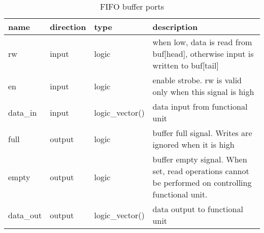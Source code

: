 	\FloatBarrier
	
	\begin{table}[!htb]
		\begin{tabular}{| l| l | l | p{8cm} |}
			\hline
			\textbf{name} & \textbf{direction} & \textbf{type} &  \textbf{description}\\ \hline
			rw & input & logic & when low, data is read from buf[head], otherwise input is written to buf[tail]\\ \hline
			en & input & logic & enable strobe. rw is valid only when this signal is high \\ \hline
			data\_in & input & logic\_vector(\dataW) & data input from functional unit \\ \hline
			full & output & logic & buffer full signal. Writes are ignored when it is high \\ \hline
			empty & output & logic & buffer empty signal. When set, read operations cannot be performed on controlling functional unit. \\ \hline
			data\_out & output & logic\_vector(\dataW) & data output to functional unit \\ \hline
		\end{tabular}
		\caption{FIFO buffer ports}
		\label{table:out_buffer_description}
		\centering
	\end{table}